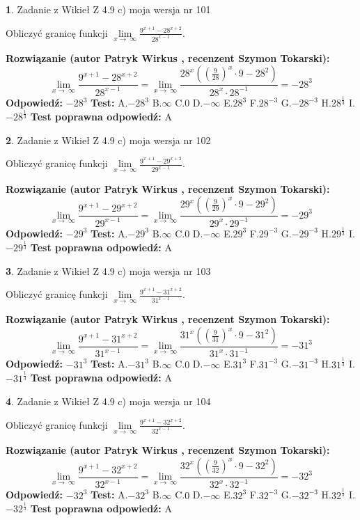 \documentclass[12pt, a4paper]{article}
\theoremstyle{definition} %
\newtheorem{zad}{}
\newcommand{\zadStart}[1]{\begin{zad}#1\newline}
\newcommand{\zadStop}{\end{zad}}
\newcommand{\rozwStart}[2]{\noindent \textbf{Rozwiązanie (autor #1 , recenzent #2): }\newline}
\newcommand{\rozwStop}{\newline}
\newcommand{\odpStart}{\noindent \textbf{Odpowiedź:}\newline}
\newcommand{\odpStop}{\newline}
\newcommand{\testStart}{\noindent \textbf{Test:}\newline}
\newcommand{\testStop}{\newline}
\newcommand{\kluczStart}{\noindent \textbf{Test poprawna odpowiedź:}\newline}
\newcommand{\kluczStop}{\newline}
\begin{document}
\zadStart{Zadanie z Wikieł Z 4.9 c) moja wersja nr 101}


Obliczyć granicę funkcji  $\lim\limits_{x\to\ \infty}\frac{9^{x+1}-28^{x+2}}{28^{x-1}}$.
\zadStop
\rozwStart{Patryk Wirkus}{Szymon Tokarski}
$$\lim\limits_{x\to\ \infty}\frac{9^{x+1}-28^{x+2}}{28^{x-1}}=\lim\limits_{x\to\ \infty}\frac{28^{x}((\frac{9}{28})^{x}\cdot 9 -28^{2})}{28^{x}\cdot 28^{-1}} = -28^{3}$$
\rozwStop
\odpStart
$-28^{3}$
\odpStop
\testStart
A.$-28^{3}$ B.$\infty$ C.$0$ D.$-\infty$ E.$28^{3}$
F.$28^{-3}$ G.$-28^{-3}$
H.$28^{\frac{1}{3}}$
I.$-28^{\frac{1}{3}}$
\testStop
\kluczStart
A
\kluczStop



\zadStart{Zadanie z Wikieł Z 4.9 c) moja wersja nr 102}


Obliczyć granicę funkcji  $\lim\limits_{x\to\ \infty}\frac{9^{x+1}-29^{x+2}}{29^{x-1}}$.
\zadStop
\rozwStart{Patryk Wirkus}{Szymon Tokarski}
$$\lim\limits_{x\to\ \infty}\frac{9^{x+1}-29^{x+2}}{29^{x-1}}=\lim\limits_{x\to\ \infty}\frac{29^{x}((\frac{9}{29})^{x}\cdot 9 -29^{2})}{29^{x}\cdot 29^{-1}} = -29^{3}$$
\rozwStop
\odpStart
$-29^{3}$
\odpStop
\testStart
A.$-29^{3}$ B.$\infty$ C.$0$ D.$-\infty$ E.$29^{3}$
F.$29^{-3}$ G.$-29^{-3}$
H.$29^{\frac{1}{3}}$
I.$-29^{\frac{1}{3}}$
\testStop
\kluczStart
A
\kluczStop



\zadStart{Zadanie z Wikieł Z 4.9 c) moja wersja nr 103}


Obliczyć granicę funkcji  $\lim\limits_{x\to\ \infty}\frac{9^{x+1}-31^{x+2}}{31^{x-1}}$.
\zadStop
\rozwStart{Patryk Wirkus}{Szymon Tokarski}
$$\lim\limits_{x\to\ \infty}\frac{9^{x+1}-31^{x+2}}{31^{x-1}}=\lim\limits_{x\to\ \infty}\frac{31^{x}((\frac{9}{31})^{x}\cdot 9 -31^{2})}{31^{x}\cdot 31^{-1}} = -31^{3}$$
\rozwStop
\odpStart
$-31^{3}$
\odpStop
\testStart
A.$-31^{3}$ B.$\infty$ C.$0$ D.$-\infty$ E.$31^{3}$
F.$31^{-3}$ G.$-31^{-3}$
H.$31^{\frac{1}{3}}$
I.$-31^{\frac{1}{3}}$
\testStop
\kluczStart
A
\kluczStop



\zadStart{Zadanie z Wikieł Z 4.9 c) moja wersja nr 104}


Obliczyć granicę funkcji  $\lim\limits_{x\to\ \infty}\frac{9^{x+1}-32^{x+2}}{32^{x-1}}$.
\zadStop
\rozwStart{Patryk Wirkus}{Szymon Tokarski}
$$\lim\limits_{x\to\ \infty}\frac{9^{x+1}-32^{x+2}}{32^{x-1}}=\lim\limits_{x\to\ \infty}\frac{32^{x}((\frac{9}{32})^{x}\cdot 9 -32^{2})}{32^{x}\cdot 32^{-1}} = -32^{3}$$
\rozwStop
\odpStart
$-32^{3}$
\odpStop
\testStart
A.$-32^{3}$ B.$\infty$ C.$0$ D.$-\infty$ E.$32^{3}$
F.$32^{-3}$ G.$-32^{-3}$
H.$32^{\frac{1}{3}}$
I.$-32^{\frac{1}{3}}$
\testStop
\kluczStart
A
\kluczStop
\end{document}
